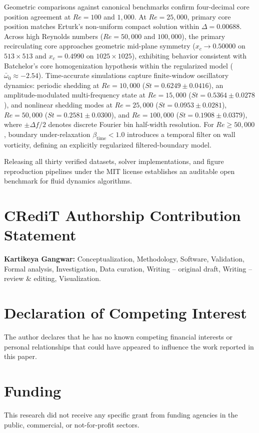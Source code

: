 \documentclass[11pt,a4paper]{article}
\begin{document}
Geometric comparisons against canonical benchmarks confirm four-decimal core position agreement at $Re = 100$ and $1{,}000$. At $Re = 25{,}000$, primary core position matches Erturk's non-uniform compact solution within $\Delta = 0.00688$. Across high Reynolds numbers ($Re = 50{,}000$ and $100{,}000$), the primary recirculating core approaches geometric mid-plane symmetry ($x_c \to 0.50000$ on $513 \times 513$ and $x_c = 0.4990$ on $1025 \times 1025$), exhibiting behavior consistent with Batchelor's core homogenization hypothesis within the regularized model ($\bar{\omega}_0 \approx -2.54$). Time-accurate simulations capture finite-window oscillatory dynamics: periodic shedding at $Re = 10{,}000$ ($St = 0.6249 \pm 0.0416$), an amplitude-modulated multi-frequency state at $Re = 15{,}000$ ($St = 0.5364 \pm 0.0278$), and nonlinear shedding modes at $Re = 25{,}000$ ($St = 0.0953 \pm 0.0281$), $Re = 50{,}000$ ($St = 0.2581 \pm 0.0300$), and $Re = 100{,}000$ ($St = 0.1908 \pm 0.0379$), where $\pm \Delta f / 2$ denotes discrete Fourier bin half-width resolution. For $Re \ge 50{,}000$, boundary under-relaxation $\beta_{\text{time}} < 1.0$ introduces a temporal filter on wall vorticity, defining an explicitly regularized filtered-boundary model.

Releasing all thirty verified datasets, solver implementations, and figure reproduction pipelines under the MIT license establishes an auditable open benchmark for fluid dynamics algorithms.

\section*{CRediT Authorship Contribution Statement}
\textbf{Kartikeya Gangwar:} Conceptualization, Methodology, Software, Validation, Formal analysis, Investigation, Data curation, Writing -- original draft, Writing -- review \& editing, Visualization.

\section*{Declaration of Competing Interest}
The author declares that he has no known competing financial interests or personal relationships that could have appeared to influence the work reported in this paper.

\section*{Funding}
This research did not receive any specific grant from funding agencies in the public, commercial, or not-for-profit sectors.
\end{document}
